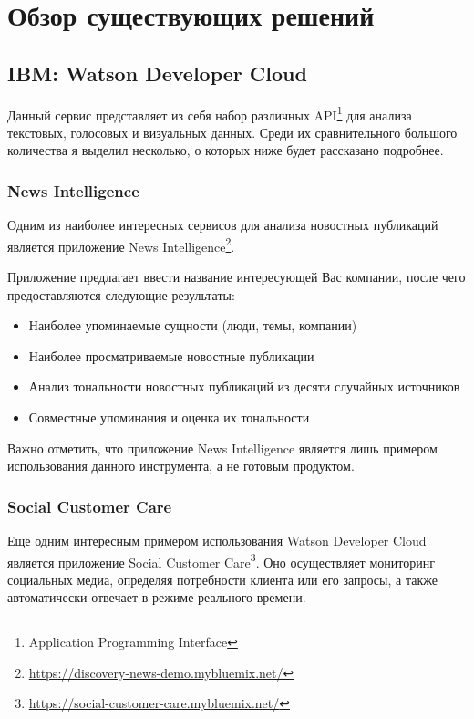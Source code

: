 \section{Обзор существующих решений}

\subsection{IBM: Watson Developer Cloud}

Данный сервис представляет из себя набор различных API\footnote{Application Programming Interface} для анализа текстовых, голосовых и визуальных данных. Среди их сравнительного большого количества я выделил несколько, о которых ниже будет рассказано подробнее.

\subsubsection{News Intelligence}

Одним из наиболее интересных сервисов для анализа новостных публикаций является приложение News Intelligence\footnote{\url{https://discovery-news-demo.mybluemix.net/}}.

Приложение предлагает ввести название интересующей Вас компании, после чего предоставляются следующие результаты:

\begin{itemize}

\item Наиболее упоминаемые сущности (люди, темы, компании)

\item Наиболее просматриваемые новостные публикации

\item Анализ тональности новостных публикаций из десяти случайных источников

\item Совместные упоминания и оценка их тональности

\end{itemize}

Важно отметить, что приложение News Intelligence является лишь примером использования данного инструмента, а не готовым продуктом.

\subsubsection{Social Customer Care}

Еще одним интересным примером использования Watson Developer Cloud является приложение Social Customer Care\footnote{\url{https://social-customer-care.mybluemix.net/}}. Оно осуществляет мониторинг социальных медиа, определяя потребности клиента или его запросы, а также автоматически отвечает в режиме реального времени.

